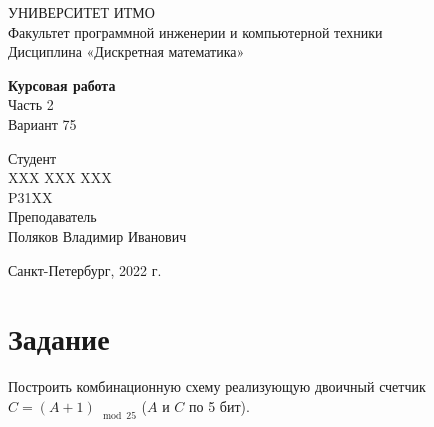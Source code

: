 \documentclass{article}
\begin{document}
\begin{center}
    УНИВЕРСИТЕТ ИТМО \\
    Факультет программной инженерии и компьютерной техники \\
    Дисциплина «Дискретная математика»
    
    \vspace{5cm}

    \large
    \textbf{Курсовая работа} \\
    Часть 2 \\
    Вариант 75
\end{center}

\vspace{2cm}

\hfill\begin{minipage}{0.35\linewidth}
Студент \\
XXX XXX XXX \\
P31XX \\

Преподаватель \\
Поляков Владимир Иванович
\end{minipage}

\vfill

\begin{center}
    Санкт-Петербург, 2022 г.
\end{center}

\thispagestyle{empty}
\newpage

\section*{Задание}
Построить комбинационную схему реализующую двоичный счетчик $C = (A + 1)_{\mod 25 }$ ($A$ и $C$ по 5 бит).
\end{document}
